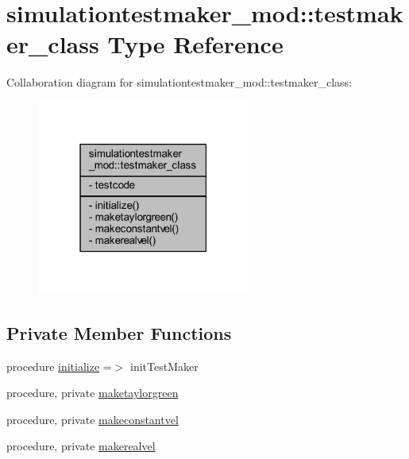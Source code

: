 \hypertarget{structsimulationtestmaker__mod_1_1testmaker__class}{}\section{simulationtestmaker\+\_\+mod\+:\+:testmaker\+\_\+class Type Reference}
\label{structsimulationtestmaker__mod_1_1testmaker__class}


Collaboration diagram for simulationtestmaker\+\_\+mod\+:\+:testmaker\+\_\+class\+:\nopagebreak
\begin{figure}[H]
\begin{center}
\leavevmode
\includegraphics[width=199pt]{structsimulationtestmaker__mod_1_1testmaker__class__coll__graph}
\end{center}
\end{figure}
\subsection*{Private Member Functions}
\begin{DoxyCompactItemize}
\item 
procedure \mbox{\hyperlink{structsimulationtestmaker__mod_1_1testmaker__class_a14f17d4cb04e3e7b153d8052e1eee4de}{initialize}} =$>$ init\+Test\+Maker
\item 
procedure, private \mbox{\hyperlink{structsimulationtestmaker__mod_1_1testmaker__class_a5beeed7f1010481f6d7880dda99c6f52}{maketaylorgreen}}
\item 
procedure, private \mbox{\hyperlink{structsimulationtestmaker__mod_1_1testmaker__class_aa4afe3d8d2a881828d9508856439169a}{makeconstantvel}}
\item 
procedure, private \mbox{\hyperlink{structsimulationtestmaker__mod_1_1testmaker__class_ad287a21d287f559c376017929c048786}{makerealvel}}
\end{DoxyCompactItemize}

